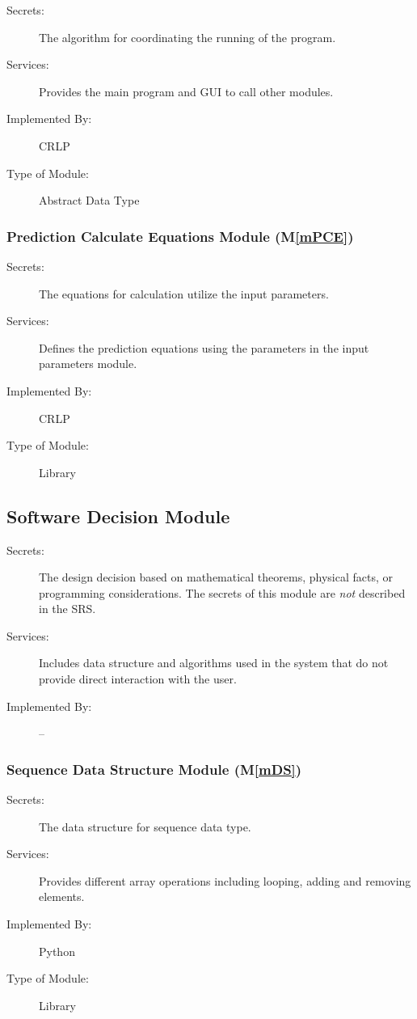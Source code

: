 \documentclass[12pt, titlepage]{article}
\newcommand{\mref}[1]{M\ref{#1}}
\begin{document}
\begin{description}
\begin{description}
    \item[Secrets:] The algorithm for coordinating the running of the program.
    \item[Services:] Provides the main program and GUI to call other modules.
    \item[Implemented By:] CRLP
    \item [Type of Module:] Abstract Data Type
\end{description}

\subsubsection{Prediction Calculate Equations Module (\mref{mPCE})}

\begin{description}
    \item[Secrets:] The equations for calculation utilize the input parameters.
    \item[Services:] Defines the prediction equations using the parameters in the input parameters module.
    \item[Implemented By:] CRLP
    \item [Type of Module:] Library
\end{description}

\subsection{Software Decision Module}

\begin{description}
    \item[Secrets:] The design decision based on mathematical theorems, physical facts, or programming considerations. The secrets of this module are \emph{not} described in the SRS.
    \item[Services:] Includes data structure and algorithms used in the system that do not provide direct interaction with the user. 

\item[Implemented By:] --
\end{description}

\subsubsection{Sequence Data Structure Module (\mref{mDS})}

\begin{description}
    \item[Secrets:] The data structure for sequence data type.
    \item[Services:] Provides different array operations including looping, adding and removing elements.
    \item[Implemented By:] Python
    \item [Type of Module:] Library
\end{description}


\end{description}
\end{document}
